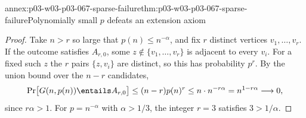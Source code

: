 \begin{annexitem}{annex:p03-w03-p03-067-sparse-failure}{thm:p03-w03-p03-067-sparse-failure}{Polynomially small \(p\) defeats an extension axiom}
\begin{proof}
Take \(n>r\) so large that \(p(n)\leq n^{-\alpha}\), and fix \(r\) distinct
vertices \(v_1,\ldots,v_r\).  If the outcome satisfies \(A_{r,0}\), some
\(z\notin\{v_1,\ldots,v_r\}\) is adjacent to every \(v_i\).  For a fixed such
\(z\) the \(r\) pairs \(\{z,v_i\}\) are distinct, so this has probability
\(p^r\).  By the union bound over the \(n-r\) candidates,
\[
 \Pr\bigl[G(n,p(n))\entails A_{r,0}\bigr]\leq(n-r)p(n)^r\leq n\cdot n^{-r\alpha}
 =n^{1-r\alpha}\longrightarrow0,
\]
since \(r\alpha>1\).  For \(p=n^{-\alpha}\) with \(\alpha>1/3\), the integer
\(r=3\) satisfies \(3>1/\alpha\).
\end{proof}
\end{annexitem}

